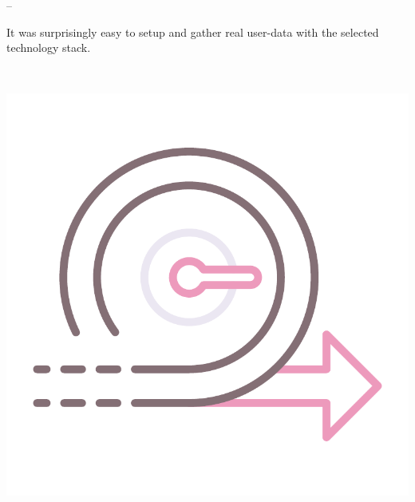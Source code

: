 \documentclass[xcolor=svgnames,10pt,aspectratio=1610]{beamer}
\begin{document}
\begin{frame}
\begin{minipage}{.7\textwidth}
\begin{minipage}{0.05\textwidth}
    \end{minipage}
    \hspace{0.15cm}
    --
    \hspace{0.15cm}
    \begin{minipage}{0.9\textwidth}
      It was surprisingly easy to setup and gather real user-data with the
      selected technology stack.
    \end{minipage}
  \end{minipage}

  \vspace{0.8cm} \\

  \begin{minipage}{0.7\textwidth}
    \hspace{-0.3cm}
    \begin{minipage}{0.05\textwidth}
      \includegraphics[width=\textwidth]{img/iterationsmall.pdf}
    \end{minipage}
    \begin{minipage}{0.05\textwidth}

\end{minipage}
\end{minipage}
\end{frame}
\end{document}

